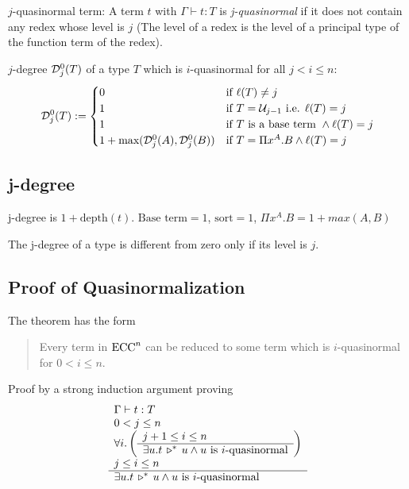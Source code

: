 \begin{definition}
  $j$-quasinormal term:
  A term $t$ with $\Gamma \vdash t : T$ is \emph{j-quasinormal} if it does not
  contain any redex whose level is $j$ (The level of a redex is the level of
  a principal type of the function term of the redex).
\end{definition}

\begin{definition}
  $j$-degree ${\cal D}^0_j(T)$  of a type $T$ which is $i$-quasinormal for all
  $j < i \le n$:
  $$
  {\cal D}^0_j(T) :=
  \begin{cases}
    0 & \text{if } \ell(T) \ne j
    \\
    1 & \text{if } T = {\cal U}_{j-1} \text{ i.e. } \ell(T) = j
    \\
    1 & \text{if $T$ is a base term } \land \ell(T) = j
    \\
    1 + \text{max}({\cal D}^0_j(A), {\cal D}^0_j(B)) &
    \text{if } T = \Pi x^A.B \land \ell(T) = j
  \end{cases}
  $$
\end{definition}

\subsection{j-degree}

j-degree is $1 + \text{depth}(t)$. $\text{Base term}  = 1$, $\text{sort} = 1$,
$\Pi x^A.B = 1 + max(A,B)$ 

The j-degree of a type is different from zero only if its level is $j$.



\subsection{Proof of Quasinormalization}

The theorem has the form
\begin{quote}
  Every term in $\text{ECC}^n$ can be reduced to some term which is $i$-quasinormal
  for $0 < i \le n$.
\end{quote}


Proof by a strong induction argument proving
$$
\begin{array}{l} 
  \Gamma \vdash t : T
  \\
  0 < j \le n
  \\
  \forall i.
  \left(
    \begin{array}{l} j+1 \le i \le n \\ \hline \exists u. t \,\triangleright^*\, u \land u \text{ is $i$-quasinormal}\end{array}
  \right)
  \\
  j \le i \le n
 \\ \hline 
  \exists u. t \,\triangleright^*\, u \land u \text{ is $i$-quasinormal}
\end{array}
$$


